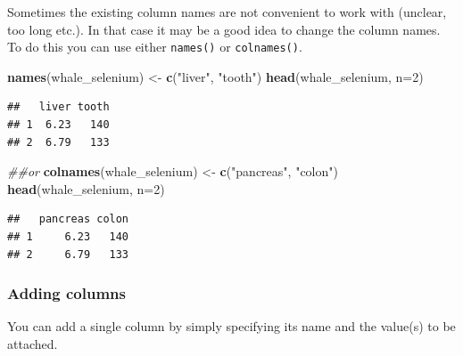 \documentclass[]{book}
\newenvironment{Shaded}{\begin{snugshade}}{\end{snugshade}}
\newcommand{\CommentTok}[1]{\textcolor[rgb]{0.56,0.35,0.01}{\textit{#1}}}
\newcommand{\DataTypeTok}[1]{\textcolor[rgb]{0.13,0.29,0.53}{#1}}
\newcommand{\DecValTok}[1]{\textcolor[rgb]{0.00,0.00,0.81}{#1}}
\newcommand{\KeywordTok}[1]{\textcolor[rgb]{0.13,0.29,0.53}{\textbf{#1}}}
\newcommand{\NormalTok}[1]{#1}
\newcommand{\OperatorTok}[1]{\textcolor[rgb]{0.81,0.36,0.00}{\textbf{#1}}}
\newcommand{\StringTok}[1]{\textcolor[rgb]{0.31,0.60,0.02}{#1}}
\begin{document}
Sometimes the existing column names are not convenient to work with (unclear, too long etc.). In that case it may be a good idea to change the column names. To do this you can use either \texttt{names()} or \texttt{colnames()}.

\begin{Shaded}
\begin{Highlighting}[]
\KeywordTok{names}\NormalTok{(whale_selenium) <-}\StringTok{ }\KeywordTok{c}\NormalTok{(}\StringTok{"liver"}\NormalTok{, }\StringTok{"tooth"}\NormalTok{)}
\KeywordTok{head}\NormalTok{(whale_selenium, }\DataTypeTok{n=}\DecValTok{2}\NormalTok{)}
\end{Highlighting}
\end{Shaded}

\begin{verbatim}
##   liver tooth
## 1  6.23   140
## 2  6.79   133
\end{verbatim}

\begin{Shaded}
\begin{Highlighting}[]
\CommentTok{##or}
\KeywordTok{colnames}\NormalTok{(whale_selenium) <-}\StringTok{ }\KeywordTok{c}\NormalTok{(}\StringTok{"pancreas"}\NormalTok{, }\StringTok{"colon"}\NormalTok{)}
\KeywordTok{head}\NormalTok{(whale_selenium, }\DataTypeTok{n=}\DecValTok{2}\NormalTok{)}
\end{Highlighting}
\end{Shaded}

\begin{verbatim}
##   pancreas colon
## 1     6.23   140
## 2     6.79   133
\end{verbatim}

\hypertarget{adding-columns}{%
\subsubsection*{Adding columns}\label{adding-columns}}

You can add a single column by simply specifying its name and the value(s) to be attached.

\begin{Shaded}
\end{Shaded}
\end{document}
